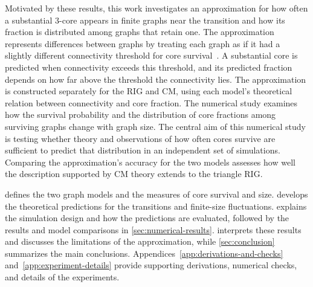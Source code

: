 Motivated by these results, this work investigates an approximation for
how often a substantial $3$-core appears in finite graphs near the
transition and how its fraction is distributed among graphs that retain
one. The approximation represents differences between graphs by treating
each graph as if it had a slightly different connectivity threshold for
core survival~\cite{janson2008fluctuations}. A substantial core is predicted
when connectivity exceeds this threshold, and its predicted fraction
depends on how far above the threshold the connectivity lies. The
approximation is constructed separately for the RIG and CM, using each
model's theoretical relation between connectivity and core fraction.
The numerical study examines how the survival probability and the
distribution of core fractions among surviving graphs change with graph
size. The central aim of this numerical study is testing
whether theory and observations of how often
cores survive are sufficient to predict that distribution in an
independent set of simulations. Comparing the approximation's accuracy
for the two models assesses how well the description supported by CM
theory extends to the triangle RIG.

 defines the two graph models and the
measures of core survival and size. 
develops the theoretical predictions for the transitions and finite-size
fluctuations.  explains the simulation
design and how the predictions are evaluated, followed by the results and
model comparisons in \cref{sec:numerical-results}. 
interprets these results and discusses the limitations of the
approximation, while \cref{sec:conclusion} summarizes the main conclusions.
Appendices~\ref{app:derivations-and-checks} and~\ref{app:experiment-details}
provide supporting derivations, numerical checks, and details of the
experiments.
